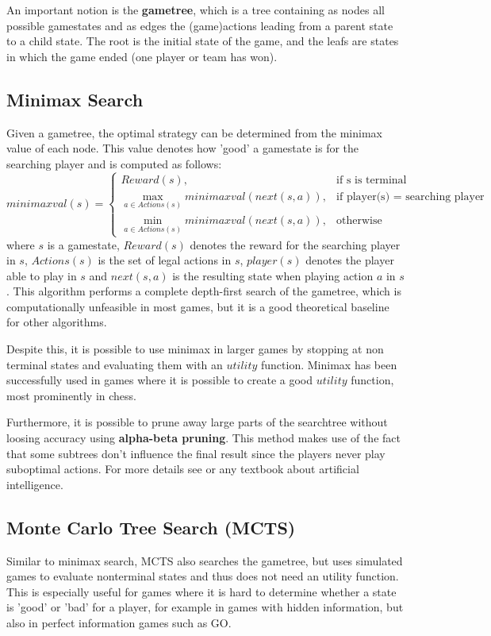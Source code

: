 An important notion is the \textbf{gametree}, which is a tree containing as nodes all possible gamestates and as edges the (game)actions leading from a parent state to a child state. The root is the initial state of the game, and the leafs are states in which the game ended (one player or team has won).

\subsection{Minimax Search}
Given a gametree, the optimal strategy can be determined from the minimax value of each node. This value denotes how 'good' a gamestate is for the searching player and is computed as follows:
$$
    minimaxval(s)=
\begin{cases}
    Reward(s), & \text{if s is terminal} \\
    \max_{a\in Actions(s)} minimaxval(next(s, a)), & \text{if player(s) = searching player} \\
    \min_{a\in Actions(s)} minimaxval(next(s, a)), & \text{otherwise}
\end{cases}
$$
where $s$ is a gamestate, $Reward(s)$ denotes the reward for the searching player in $s$, $Actions(s)$ is the set of legal actions in $s$, $player(s)$ denotes the player able to play in $s$ and $next(s, a)$ is the resulting state when playing action $a$ in $s$. \newline
This algorithm performs a complete depth-first search of the gametree, which is computationally unfeasible in most games, but it is a good theoretical baseline for other algorithms.

Despite this, it is possible to use minimax in larger games by stopping at non terminal states and evaluating them with an $utility$ function.
Minimax has been successfully used in games where it is possible to create a good $utility$ function, most prominently in chess.

Furthermore, it is possible to prune away large parts of the searchtree without loosing accuracy using \textbf{alpha-beta pruning}. This method makes use of the fact that some subtrees don't influence the final result since the players never play suboptimal actions. For more details see \cite[chapter 5, p.~170+]{russel14} or any textbook about artificial intelligence.

\subsection{Monte Carlo Tree Search (MCTS)}
Similar to minimax search, MCTS also searches the gametree, but uses simulated games to evaluate nonterminal states and thus does not need an utility function. This is especially useful for games where it is hard to determine whether a state is 'good' or 'bad' for a player, for example in games with hidden information, but also in perfect information games such as GO.

